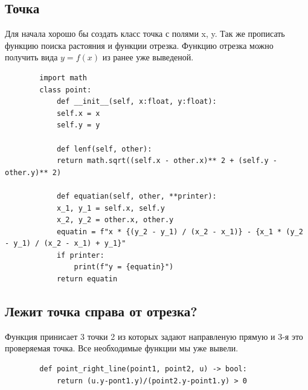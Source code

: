 \documentclass[12pt]{article} %
\begin{document}
 	 \subsection{Точка}
 	 \hspace*{1cm}Для начала хорошо бы создать класс точка с полями x, y. Так же прописать функцию поиска растояния и функции отрезка. Функцию отрезка можно получить вида $y=f(x)$ из ранее уже выведеной.
 	 \begin{verbatim}
 	 	import math
 	 	class point:
 	 	    def __init__(self, x:float, y:float):
 	 	    self.x = x
 	 	    self.y = y
 	 	
 	 	    def lenf(self, other):
 	 	    return math.sqrt((self.x - other.x)** 2 + (self.y - other.y)** 2)
 	 	
 	 	    def equatian(self, other, **printer):
 	 	    x_1, y_1 = self.x, self.y
 	 	    x_2, y_2 = other.x, other.y
 	 	    equatin = f"x * {(y_2 - y_1) / (x_2 - x_1)} - {x_1 * (y_2 - y_1) / (x_2 - x_1) + y_1}"
 	 	    if printer:
 	 	        print(f"y = {equatin}")
 	 	    return equatin
 	 \end{verbatim}
 	 \subsection{Лежит точка справа от отрезка?}
 	 \hspace*{1cm}Функция принисает 3 точки 2 из которых задают направленую прямую и 3-я это проверяемая точка. Все необходимые функции мы уже вывели.
 	 \begin{verbatim}
 	 	def point_right_line(point1, point2, u) -> bool:
 	 	    return (u.y-pont1.y)/(point2.y-point1.y) > 0
 	 \end{verbatim}
 	 \hspace*{1cm}
 
\end{document}
